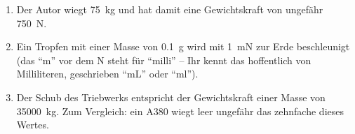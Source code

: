         \begin{enumerate}[label=\roman*)]
            \item Der Autor wiegt \qty{75}{\kg} und hat damit eine Gewichtskraft von ungefähr \qty{750}{\N}.
            \item Ein Tropfen mit einer Masse von \qty{0.1}{\g} wird mit \qty{1}{\milli\N} zur Erde beschleunigt (das ``m'' vor dem N steht für ``milli'' -- Ihr kennt das hoffentlich von Milliliteren, geschrieben ``mL'' oder ``ml'').
            \item Der Schub des Triebwerks entspricht der Gewichtskraft einer Masse von \qty[exponent-mode=fixed]{35000}{\kg}. Zum Vergleich: ein A380 wiegt leer ungefähr das zehnfache dieses Wertes.
        \end{enumerate}
